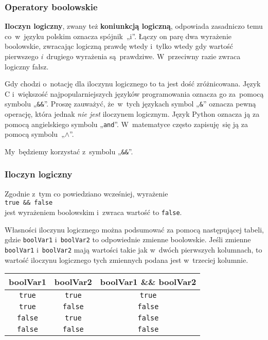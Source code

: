 \documentclass[10pt,t]{beamer}
\begin{document}
\begin{frame}
  \frametitle{Operatory boolowskie}


  \textbf{Iloczyn logiczny}, zwany też \textbf{koniunkcją logiczną},
  odpowiada zasadniczo temu co~w~języku polskim oznacza spójnik~„i”. Łączy
  on parę dwa wyrażenie boolowskie, zwracając logiczną prawdę wtedy i~tylko
  wtedy gdy wartość pierwszego \textit{i}~drugiego wyrażenia są~prawdziwe.
  W~przeciwny razie zwraca logiczny fałsz.

  Gdy chodzi o~notację dla iloczynu logicznego to ta jest dość zróżnicowana.
  Język C i~większość najpopularniejszych języków programowania oznacza
  go za~pomocą symbolu „\texttt{\&\&}”. Proszę zauważyć, że~w~tych językach
  symbol „\texttt{\&}” oznacza pewną operację, która jednak \textit{nie
    jest} iloczynem logicznym. Język Python oznacza ją za pomocą
  angielskiego symbolu „\texttt{and}”. W~matematyce często zapisuję~się ją
  za pomocą symbolu~„$\wedge$”.

  My~będziemy korzystać z~symbolu „\texttt{\&\&}”.

\end{frame}





\begin{frame}
  \frametitle{Iloczyn logiczny}


  Zgodnie z~tym co powiedziano wcześniej, wyrażenie \\
  \texttt{true \&\& false} \\
  jest wyrażeniem boolowskim i~zwraca wartość to \texttt{false}.

  Własności iloczynu logicznego można podsumować za pomocą następującej
  tabeli, gdzie \texttt{boolVar1} i~\texttt{boolVar2} to odpowiednie zmienne
  boolowskie. Jeśli zmienne \texttt{boolVar1} i~\texttt{boolVar2} mają
  wartości takie jak w~dwóch pierwszych kolumnach, to wartość iloczynu
  logicznego tych zmiennych podana jest w~trzeciej kolumnie.

  \vspace{1em}





  \begingroup

  \centering

  \begin{tabular}{|c|c|c|}
    \hline
    boolVar1 & boolVar2 & boolVar1 \&\& boolVar2 \\
    \hline
    \texttt{true}  & \texttt{true}  & \texttt{true}  \\
    \texttt{true}  & \texttt{false} & \texttt{false} \\
    \texttt{false} & \texttt{true}  & \texttt{false} \\
    \texttt{false} & \texttt{false} & \texttt{false} \\
    \hline
  \end{tabular}

  \endgroup

\end{frame}
\end{document}
